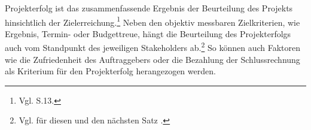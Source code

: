 Projekterfolg ist das zusammenfassende Ergebnis der Beurteilung des Projekts hinsichtlich der Zielerreichung.\footnote{Vgl. \cite{DIN.200901} S.13.}
Neben den objektiv messbaren Zielkriterien, wie Ergebnis, Ter\-min- oder Budgettreue, hängt die Beurteilung des Projekterfolgs auch vom Standpunkt des jeweiligen Stakeholders ab.\footnote{Vgl. für diesen und den nächsten Satz \cite{Angermeier.o.J.}.}
So können auch Faktoren wie die Zufriedenheit des Auftraggebers oder die Bezahlung der Schlussrechnung als Kriterium für den Projekterfolg herangezogen werden. 